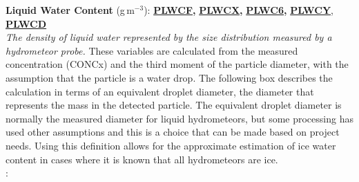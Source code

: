 \begin{hangparagraphs}
\textbf{Liquid Water Content }(g\,m\textbf{$^{-3}$}):\hypertarget{PLWCF}{}\hypertarget{PLWCX}{}\hypertarget{PLWC6}{}\hypertarget{PLWCY}{}\hypertarget{PLWCD}{}\textbf{
}\textbf{\uline{PLWCF}}\textbf{,
}\textbf{\uline{PLWCX}}\textbf{,
}\textbf{\uline{PLWC6}}\textbf{,
}\textbf{\uline{PLWCY}}, \textbf{\uline{PLWCD}}\\
\emph{The density of liquid
water represented by the size distribution measured by a hydrometeor
probe.}
These variables are calculated from the measured concentration (CONCx)
and the third moment of the particle diameter, with the assumption
that the particle is a water drop. The following box describes the
calculation in terms of an equivalent droplet diameter,
the diameter that represents the mass in the detected particle. The
equivalent droplet diameter is normally the measured diameter for
liquid hydrometeors, but some processing has used other assumptions
and this is a choice that can be made based on project needs. Using
this definition allows for the approximate estimation of ice
water content in cases where it is known that all hydrometeors are
ice. \\
:\\
\\


\end{hangparagraphs}
